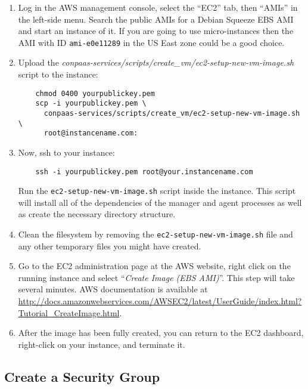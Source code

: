 \documentclass[10pt]{article}
\begin{document}
\begin{enumerate}
\item Log in the AWS management console, select the ``EC2'' tab, then ``AMIs''
in the left-side menu. Search the public AMIs for a Debian Squeeze EBS AMI and
start an instance of it. If you are going to use micro-instances then the AMI
with ID \verb+ami-e0e11289+ in the US East zone could be a good choice.

\item Upload the \textit{conpaas-services/scripts/create\_vm/ec2-setup-new-vm-image.sh} script to the instance:
  \begin{verbatim}
    chmod 0400 yourpublickey.pem
    scp -i yourpublickey.pem \
      conpaas-services/scripts/create_vm/ec2-setup-new-vm-image.sh \
      root@instancename.com:
  \end{verbatim}

\item Now, ssh to your instance:
  \begin{verbatim}
    ssh -i yourpublickey.pem root@your.instancename.com
  \end{verbatim}
  Run the \verb+ec2-setup-new-vm-image.sh+ script inside the instance.
  This script will install all of the dependencies of the manager and
  agent processes as well as create the necessary directory structure.

\item Clean the filesystem by removing the
  \verb+ec2-setup-new-vm-image.sh+ file and any other temporary files you might
  have created.

\item Go to the EC2 administration page at the AWS website, right
  click on the running instance and select ``\emph{Create Image (EBS
    AMI)}''.  This step will take several minutes. AWS documentation
  is available at
  \url{http://docs.amazonwebservices.com/AWSEC2/latest/UserGuide/index.html?Tutorial\_CreateImage.html}.

\item After the image has been fully created, you can return to the
  EC2 dashboard, right-click on your instance, and terminate it.
\end{enumerate}

\subsection{Create a Security Group}
\label{sec:secgroup}
\end{document}
